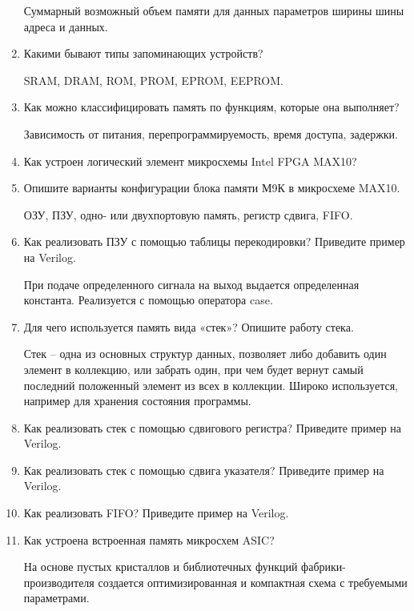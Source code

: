 \documentclass[a4paper,14pt]{article}
\begin{document}
\begin{enumerate}
		Суммарный возможный объем памяти для данных параметров ширины шины адреса и данных.
		
		\item Какими бывают типы запоминающих устройств?
		
		SRAM, DRAM, ROM, PROM, EPROM, EEPROM.
		
		\item Как можно классифицировать память по функциям, которые она выполняет?
		
		Зависимость от питания, перепрограммируемость, время доступа, задержки.
		
		\item Как устроен логический элемент микросхемы Intel FPGA MAX10?
		
		\item Опишите варианты конфигурации блока памяти М9К в микросхеме MAX10.
		
		ОЗУ, ПЗУ, одно- или двухпортовую память, регистр сдвига, FIFO.
		
		\item Как реализовать ПЗУ с помощью таблицы перекодировки? Приведите пример на Verilog.
		
		При подаче определенного сигнала на выход выдается определенная константа.
		Реализуется с помощью оператора case.
		
		\item Для чего используется память вида «стек»? Опишите работу стека.
		
		Стек -- одна из основных структур данных, позволяет либо добавить один элемент в коллекцию, или забрать один, при чем будет вернут самый последний положенный элемент из всех в коллекции.
		Широко используется, например для хранения состояния программы.
		
		\item Как реализовать стек с помощью сдвигового регистра? Приведите пример на Verilog.
		
		\item Как реализовать стек с помощью сдвига указателя? Приведите пример на Verilog.
		
		\item Как реализовать FIFO? Приведите пример на Verilog.
		
		\item Как устроена встроенная память микросхем ASIC?
		
		На основе пустых кристаллов и библиотечных функций фабрики-производителя создается оптимизированная и компактная схема с требуемыми параметрами.
		
	\end{enumerate}
	
\end{document}
